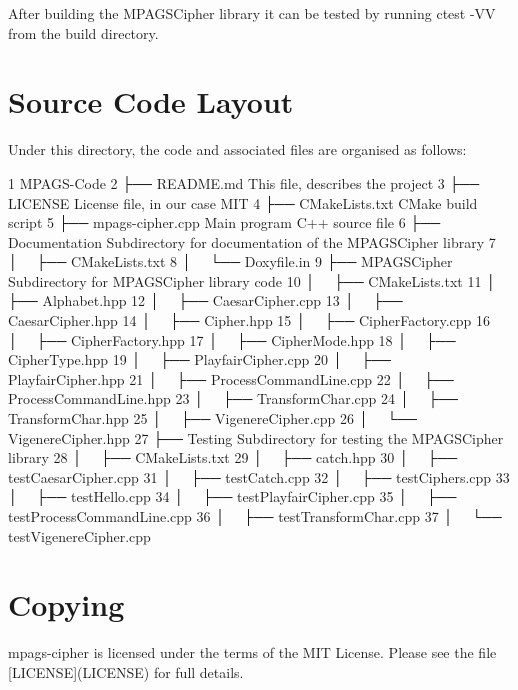 After building the M\+P\+A\+G\+S\+Cipher library it can be tested by running {\ttfamily ctest -\/\+VV} from the build directory.

\section*{Source Code Layout}

Under this directory, the code and associated files are organised as follows\+:


\begin{DoxyCode}
1 MPAGS-Code
2 ├── README.md             This file, describes the project
3 ├── LICENSE               License file, in our case MIT
4 ├── CMakeLists.txt        CMake build script
5 ├── mpags-cipher.cpp      Main program C++ source file
6 ├── Documentation         Subdirectory for documentation of the MPAGSCipher library
7 │   ├── CMakeLists.txt
8 │   └── Doxyfile.in
9 ├── MPAGSCipher           Subdirectory for MPAGSCipher library code
10 │   ├── CMakeLists.txt
11 │   ├── Alphabet.hpp
12 │   ├── CaesarCipher.cpp
13 │   ├── CaesarCipher.hpp
14 │   ├── Cipher.hpp
15 │   ├── CipherFactory.cpp
16 │   ├── CipherFactory.hpp
17 │   ├── CipherMode.hpp
18 │   ├── CipherType.hpp
19 │   ├── PlayfairCipher.cpp
20 │   ├── PlayfairCipher.hpp
21 │   ├── ProcessCommandLine.cpp
22 │   ├── ProcessCommandLine.hpp
23 │   ├── TransformChar.cpp
24 │   ├── TransformChar.hpp
25 │   ├── VigenereCipher.cpp
26 │   └── VigenereCipher.hpp
27 ├── Testing               Subdirectory for testing the MPAGSCipher library
28 │   ├── CMakeLists.txt
29 │   ├── catch.hpp
30 │   ├── testCaesarCipher.cpp
31 │   ├── testCatch.cpp
32 │   ├── testCiphers.cpp
33 │   ├── testHello.cpp
34 │   ├── testPlayfairCipher.cpp
35 │   ├── testProcessCommandLine.cpp
36 │   ├── testTransformChar.cpp
37 │   └── testVigenereCipher.cpp
\end{DoxyCode}


\section*{Copying}

{\ttfamily mpags-\/cipher} is licensed under the terms of the M\+IT License. Please see the file \mbox{[}{\ttfamily L\+I\+C\+E\+N\+SE}\mbox{]}(L\+I\+C\+E\+N\+SE) for full details. 